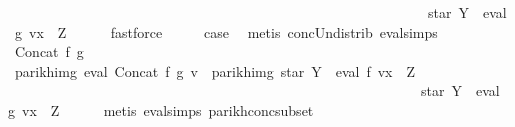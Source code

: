 \begin{isabellebody}
\ \ \ \ \ \ \ \ \ \ \ \ \ \ \ \ \ \ \ \ \ \ \ \ \ \ \ \ \ \ \ \ \ \ \ \ \ \ \ \ \ \ \ \ \ \ \ \ \ \ \ \ \ \ \ \ \ \ \ \ star\ Y\ {\isacharat}{\kern0pt}{\isacharat}{\kern0pt}\ eval\ g\ {\isacharparenleft}{\kern0pt}v{\isacharparenleft}{\kern0pt}x\ {\isacharcolon}{\kern0pt}{\isacharequal}{\kern0pt}\ Z{\isacharparenright}{\kern0pt}{\isacharparenright}{\kern0pt}{\isacharparenright}{\kern0pt}{\isachardoublequoteclose}\isanewline
\ \ \ \ \isamarkupfalse%
\ fastforce\isanewline
\ \ \isamarkupfalse%
\ \isamarkupfalse%
\ {\isacharquery}{\kern0pt}case\ \isamarkupfalse%
\ {\isacharparenleft}{\kern0pt}metis\ conc{\isacharunderscore}{\kern0pt}Un{\isacharunderscore}{\kern0pt}distrib{\isacharparenleft}{\kern0pt}{}{\isacharparenright}{\kern0pt}\ eval{\isachardot}{\kern0pt}simps{\isacharparenleft}{\kern0pt}{}{\isacharparenright}{\kern0pt}{\isacharparenright}{\kern0pt}\isanewline
{}\isamarkupfalse%
\isanewline
\ \ \isamarkupfalse%
\ {\isacharparenleft}{\kern0pt}Concat\ f\ g{\isacharparenright}{\kern0pt}\isanewline
\ \ \isamarkupfalse%
\ \isamarkupfalse%
\ {\isachardoublequoteopen}parikh{\isacharunderscore}{\kern0pt}img\ {\isacharparenleft}{\kern0pt}eval\ {\isacharparenleft}{\kern0pt}Concat\ f\ g{\isacharparenright}{\kern0pt}\ v{\isacharparenright}{\kern0pt}\ {\isasymsubseteq}\ parikh{\isacharunderscore}{\kern0pt}img\ {\isacharparenleft}{\kern0pt}{\isacharparenleft}{\kern0pt}star\ Y\ {\isacharat}{\kern0pt}{\isacharat}{\kern0pt}\ eval\ f\ {\isacharparenleft}{\kern0pt}v{\isacharparenleft}{\kern0pt}x\ {\isacharcolon}{\kern0pt}{\isacharequal}{\kern0pt}\ Z{\isacharparenright}{\kern0pt}{\isacharparenright}{\kern0pt}{\isacharparenright}{\kern0pt}\isanewline
\ \ \ \ \ \ \ \ \ \ \ \ \ \ \ \ \ \ \ \ \ \ \ \ \ \ \ \ \ \ \ \ \ \ \ \ \ \ \ \ \ \ \ \ \ \ \ \ \ \ \ \ \ \ \ \ \ \ {\isacharat}{\kern0pt}{\isacharat}{\kern0pt}\ star\ Y\ {\isacharat}{\kern0pt}{\isacharat}{\kern0pt}\ eval\ g\ {\isacharparenleft}{\kern0pt}v{\isacharparenleft}{\kern0pt}x\ {\isacharcolon}{\kern0pt}{\isacharequal}{\kern0pt}\ Z{\isacharparenright}{\kern0pt}{\isacharparenright}{\kern0pt}{\isacharparenright}{\kern0pt}{\isachardoublequoteclose}\isanewline
\ \ \ \ \isamarkupfalse%
\ {\isacharparenleft}{\kern0pt}metis\ eval{\isachardot}{\kern0pt}simps{\isacharparenleft}{\kern0pt}{}{\isacharparenright}{\kern0pt}\ parikh{\isacharunderscore}{\kern0pt}conc{\isacharunderscore}{\kern0pt}subset{\isacharparenright}{\kern0pt}\isanewline

\end{isabellebody}
